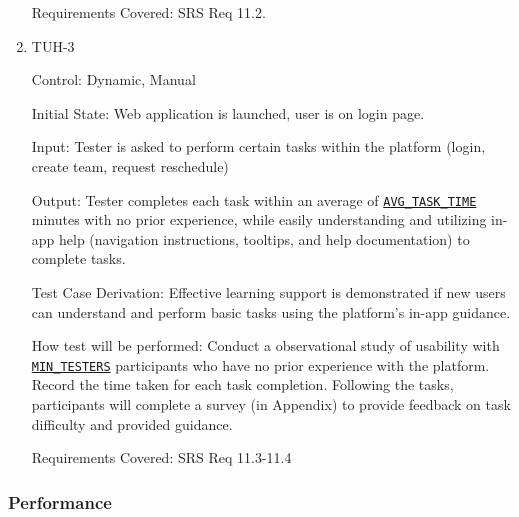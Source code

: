 \documentclass[12pt, titlepage]{article}
\begin{document}
\begin{enumerate}
Requirements Covered: SRS Req 11.2.

\item{TUH-3\\}

Control: Dynamic, Manual
					
Initial State:  Web application is launched, user is on login page.
					
Input: Tester is asked to perform certain tasks within the platform (login, create team, request reschedule)
					
Output: Tester completes each task within an average of \hyperref[AVG_TASK_TIME]{\texttt{AVG\_TASK\_TIME}} minutes with no prior experience, while easily understanding and utilizing in-app help (navigation instructions, tooltips, and help documentation) to complete tasks.

Test Case Derivation: Effective learning support is demonstrated if new users can understand and perform basic tasks using the platform's in-app guidance.

How test will be performed: Conduct a observational study of usability with \hyperref[MIN_TESTERS]{\texttt{MIN\_TESTERS}} participants who have no prior experience with the platform. Record the time taken for each task completion. Following the tasks, participants will complete a survey (in Appendix) to provide feedback on task difficulty and provided guidance.

Requirements Covered: SRS Req 11.3-11.4

\end{enumerate}

\subsubsection{Performance}
\end{document}
